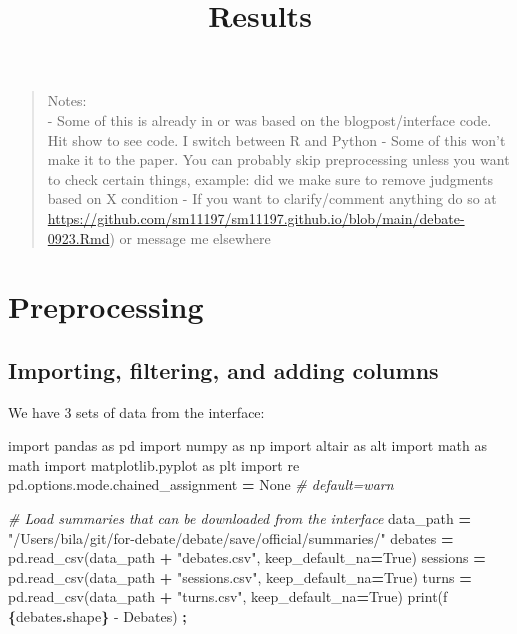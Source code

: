\documentclass[
]{article}
\title{Results}
\author{}
\date{\vspace{-2.5em}}
\newenvironment{Shaded}{\begin{snugshade}}{\end{snugshade}}
\newcommand{\BuiltInTok}[1]{#1}
\newcommand{\CommentTok}[1]{\textcolor[rgb]{0.56,0.35,0.01}{\textit{#1}}}
\newcommand{\ImportTok}[1]{#1}
\newcommand{\NormalTok}[1]{#1}
\newcommand{\OperatorTok}[1]{\textcolor[rgb]{0.81,0.36,0.00}{\textbf{#1}}}
\newcommand{\SpecialCharTok}[1]{\textcolor[rgb]{0.81,0.36,0.00}{\textbf{#1}}}
\newcommand{\SpecialStringTok}[1]{\textcolor[rgb]{0.31,0.60,0.02}{#1}}
\newcommand{\StringTok}[1]{\textcolor[rgb]{0.31,0.60,0.02}{#1}}
\newcommand{\VariableTok}[1]{\textcolor[rgb]{0.00,0.00,0.00}{#1}}
\begin{document}
\maketitle

\begin{quote}
Notes:\\
- Some of this is already in or was based on the blogpost/interface
code. Hit show to see code. I switch between R and Python - Some of this
won't make it to the paper. You can probably skip preprocessing unless
you want to check certain things, example: did we make sure to remove
judgments based on X condition - If you want to clarify/comment anything
do so at
\url{https://github.com/sm11197/sm11197.github.io/blob/main/debate-0923.Rmd})
or message me elsewhere
\end{quote}

\section{Preprocessing}\label{preprocessing}

\subsection{Importing, filtering, and adding
columns}\label{importing-filtering-and-adding-columns}

We have 3 sets of data from the interface:

\begin{Shaded}
\begin{Highlighting}[]
\ImportTok{import}\NormalTok{ pandas }\ImportTok{as}\NormalTok{ pd}
\ImportTok{import}\NormalTok{ numpy }\ImportTok{as}\NormalTok{ np}
\ImportTok{import}\NormalTok{ altair }\ImportTok{as}\NormalTok{ alt}
\ImportTok{import}\NormalTok{ math }\ImportTok{as}\NormalTok{ math}
\ImportTok{import}\NormalTok{ matplotlib.pyplot }\ImportTok{as}\NormalTok{ plt}
\ImportTok{import}\NormalTok{ re}
\NormalTok{pd.options.mode.chained\_assignment }\OperatorTok{=} \VariableTok{None}  \CommentTok{\# default=\textquotesingle{}warn\textquotesingle{}}

\CommentTok{\# Load summaries that can be downloaded from the interface}
\NormalTok{data\_path }\OperatorTok{=} \StringTok{"/Users/bila/git/for{-}debate/debate/save/official/summaries/"}
\NormalTok{debates }\OperatorTok{=}\NormalTok{ pd.read\_csv(data\_path }\OperatorTok{+} \StringTok{"debates.csv"}\NormalTok{, keep\_default\_na}\OperatorTok{=}\VariableTok{True}\NormalTok{)}
\NormalTok{sessions }\OperatorTok{=}\NormalTok{ pd.read\_csv(data\_path }\OperatorTok{+} \StringTok{"sessions.csv"}\NormalTok{, keep\_default\_na}\OperatorTok{=}\VariableTok{True}\NormalTok{)}
\NormalTok{turns }\OperatorTok{=}\NormalTok{ pd.read\_csv(data\_path }\OperatorTok{+} \StringTok{"turns.csv"}\NormalTok{, keep\_default\_na}\OperatorTok{=}\VariableTok{True}\NormalTok{)}
\BuiltInTok{print}\NormalTok{(}\SpecialStringTok{f\textquotesingle{} }\SpecialCharTok{\{}\NormalTok{debates}\SpecialCharTok{.}\NormalTok{shape}\SpecialCharTok{\}}\SpecialStringTok{ {-} Debates\textquotesingle{}}\NormalTok{) }\OperatorTok{;}
\end{Highlighting}
\end{Shaded}
\end{document}
